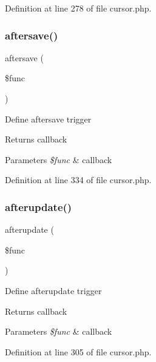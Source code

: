 Definition at line 278 of file cursor.\+php.

\hypertarget{class_d_b_1_1_cursor_a4b19070ae7f1fc2edeee8e0252f8ebb2}{}\label{class_d_b_1_1_cursor_a4b19070ae7f1fc2edeee8e0252f8ebb2} 
\subsubsection{\texorpdfstring{aftersave()}{aftersave()}}
{\footnotesize\ttfamily aftersave (\begin{DoxyParamCaption}\item[{}]{\$func }\end{DoxyParamCaption})}

Define aftersave trigger \begin{DoxyReturn}{Returns}
callback 
\end{DoxyReturn}

\begin{DoxyParams}{Parameters}
{\em \$func} & callback \\
\hline
\end{DoxyParams}


Definition at line 334 of file cursor.\+php.

\hypertarget{class_d_b_1_1_cursor_a2b621278d4f2ed751338a1d1bfb60e70}{}\label{class_d_b_1_1_cursor_a2b621278d4f2ed751338a1d1bfb60e70} 
\subsubsection{\texorpdfstring{afterupdate()}{afterupdate()}}
{\footnotesize\ttfamily afterupdate (\begin{DoxyParamCaption}\item[{}]{\$func }\end{DoxyParamCaption})}

Define afterupdate trigger \begin{DoxyReturn}{Returns}
callback 
\end{DoxyReturn}

\begin{DoxyParams}{Parameters}
{\em \$func} & callback \\
\hline
\end{DoxyParams}


Definition at line 305 of file cursor.\+php.

